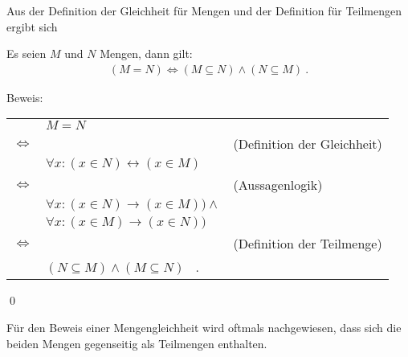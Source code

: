 \begin{Unit}[Bemerkung]
Aus der Definition der Gleichheit für Mengen und der Definition für Teilmengen 
ergibt sich

\begin{Bemerkung}
  Es seien $M$ und $N$ Mengen, dann gilt:
  \begin{align}
    (M = N) \Leftrightarrow (M \subseteq N) \wedge (N \subseteq M)\ .
  \end{align}
\end{Bemerkung}

Beweis: \newline
\begin{tabular}{l l l}
  & $M = N$ &\\
    $\Leftrightarrow$ & & (Definition der Gleichheit) \\
  & $\forall x : (x \in N) \leftrightarrow (x \in M)$ & \\
    $\Leftrightarrow$ & & (Aussagenlogik) \\
  & $\forall x : (x \in N) \rightarrow (x \in M)) \land$ & \\
  & $\forall x : (x \in M) \rightarrow (x \in N))$ & \\
    $\Leftrightarrow$ & & (Definition der Teilmenge) \\
  & $(N \subseteq M) \land (M \subseteq N)$ \ . & \\
\end{tabular}
 
\qed

Für den Beweis einer Mengengleichheit wird oftmals nachgewiesen, dass sich 
die beiden Mengen gegenseitig als Teilmengen enthalten.
\end{Unit}

